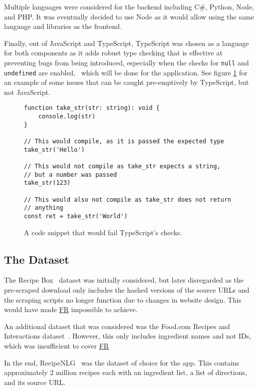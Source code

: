 Multiple languages were considered for the backend including C\#, Python, Node,
and PHP. It was eventually decided to use Node as it would allow using the same
language and libraries as the frontend.

Finally, out of JavaScript and TypeScript, TypeScript was chosen as a language
for both components as it adds robust type checking that is effective at preventing
bugs from being introduced, especially when the checks for \texttt{null} and
\texttt{undefined} are enabled,~\cite{gao_type_2017} which will be done for
the application. See figure \ref{fig:type_check} for an example of some issues
that can be caught pre-emptively by TypeScript, but not JavaScript.

\begin{figure}
    \caption{\label{fig:type_check}A code snippet that would fail TypeScript's checks.}
    \begin{verbatim}
function take_str(str: string): void {
    console.log(str)
}

// This would compile, as it is passed the expected type
take_str('Hello')

// This would not compile as take_str expects a string,
// but a number was passed
take_str(123)

// This would also not compile as take_str does not return
// anything
const ret = take_str('World')
    \end{verbatim}
\end{figure}

\subsection{The Dataset}\label{sec:data_pre_process}

The Recipe Box~\cite{lee_recipe_2017} dataset was initially considered, but later disregarded as the pre-scraped download only includes the
hashed versions of the source URLs and the scraping scripts no longer function due to changes in website design. This would have made
\hyperref[req:sources]{FR} impossible to achieve.

An additional dataset that was considered was the Food.com Recipes and Interactions dataset~\cite{li_foodcom_2019}. However, this only includes
ingredient names and not IDs, which was insufficient to cover \hyperref[req:track_amounts]{FR}

In the end, RecipeNLG~\cite{bien_recipenlg_2020} was the dataset of choice for the \chef{} app. This contains approximately 2 million recipes
each with an ingredient list, a list of directions, and its source URL.

